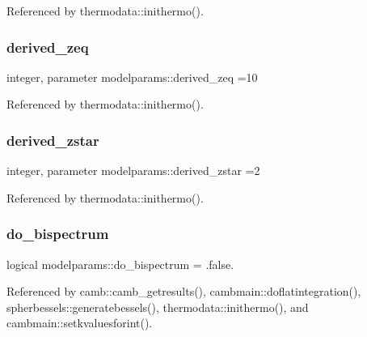 Referenced by thermodata\+::inithermo().

\mbox{\label{namespacemodelparams_a47dbe62349dd11d37540763b6dc4e630}} 
\subsubsection{\texorpdfstring{derived\+\_\+zeq}{derived\_zeq}}
{\footnotesize\ttfamily integer, parameter modelparams\+::derived\+\_\+zeq =10}



Referenced by thermodata\+::inithermo().

\mbox{\label{namespacemodelparams_a179ecd2347ad710da08fc22b9d583f02}} 
\subsubsection{\texorpdfstring{derived\+\_\+zstar}{derived\_zstar}}
{\footnotesize\ttfamily integer, parameter modelparams\+::derived\+\_\+zstar =2}



Referenced by thermodata\+::inithermo().

\mbox{\label{namespacemodelparams_aa42e1180e92882f566f30d970dc110a4}} 
\subsubsection{\texorpdfstring{do\+\_\+bispectrum}{do\_bispectrum}}
{\footnotesize\ttfamily logical modelparams\+::do\+\_\+bispectrum = .false.}



Referenced by camb\+::camb\+\_\+getresults(), cambmain\+::doflatintegration(), spherbessels\+::generatebessels(), thermodata\+::inithermo(), and cambmain\+::setkvaluesforint().

\mbox{\label{namespacemodelparams_a4c0c5110385ed23392c37abe83c629d5}} 
